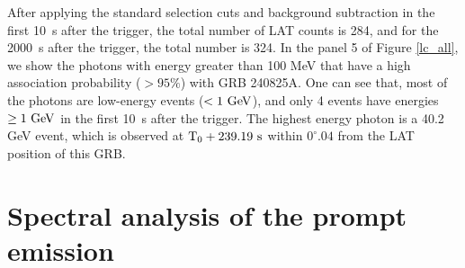 \documentclass[twocolumn]{aastex631}
\begin{document}
After applying the standard selection cuts and background subtraction in the first 10~s after the trigger, the total number of LAT counts is 284, and for the 2000~s after the trigger, the total number is 324.
In the panel 5 of Figure \ref{lc_all}, we show the photons  with energy greater than 100 MeV that have a high association probability ($> 95\%$) with GRB 240825A. One can  see that, most of the photons are low-energy events ($< 1~\rm GeV$), and only 4 events have energies $\geq1~\rm GeV$ in the first 10~s after the trigger. The highest energy photon is a 40.2 GeV event, which is observed at $\rm T_0 + 239.19~s$  within $0^\circ.04$ from the LAT position of this GRB. 







\section{Spectral analysis of the prompt emission} 
\label{sec:data_spec}

\end{document}
